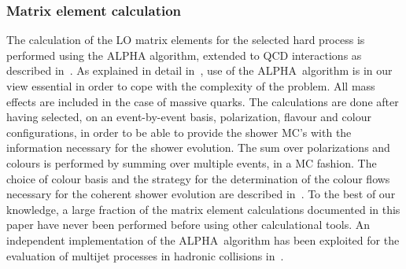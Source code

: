 \documentclass[paper]{JHEP3}
\def\ALPHA{{\small ALPHA}}
\begin{document}
\subsubsection{Matrix element calculation}
The calculation of the LO matrix elements for the selected hard
process is performed using the \ALPHA\cite{Caravaglios:1995cd}
algorithm, extended to QCD interactions as described
in~\cite{Caravaglios:1999yr,Mangano:2001xp}.  As explained in detail
in~\cite{Mangano:2001xp}, use of the \ALPHA\ algorithm is in our view
essential in order to cope with the complexity of the problem.  All
mass effects are included in the case of massive quarks.  The
calculations are done after having selected, on an event-by-event
basis, polarization, flavour and colour configurations, in order to be
able to provide the shower MC's with the information necessary for the
shower evolution. The sum over polarizations and colours is performed
by summing over multiple events, in a MC fashion.  The choice of
colour basis and the strategy for the determination of the colour
flows necessary for the coherent shower evolution are described
in~\cite{Mangano:2001xp}. 
To the best of our knowledge, a large fraction of the matrix element
calculations documented in this paper have never been performed before
using other calculational tools.  An independent implementation of the
\ALPHA\ algorithm has been exploited for the evaluation of multijet
processes in hadronic collisions
in~\cite{Draggiotis:1998gr,Draggiotis:2002hm}.
 
\end{document}
